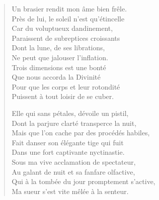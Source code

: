 \begin{verse}
  Un brasier rendit mon âme bien frêle.\\  %
  Près de lui, le soleil n’est qu’étincelle\\  %
  Car du voluptueux dandinement,\\  %
  Paraissent de subreptices croissants\\  %
  Dont la lune, de ses librations,\\  %
  Ne peut que jalouser l’inflation.\\  %
  Trois dimensions est une bonté\\  %
  Que nous accorda la Divinité\\  %
  Pour que les corps et leur rotondité\\  %
  Puissent à tout loisir de se cuber. 

  Elle qui sans pétales, dévoile un pistil,\\  %
  Dont la parjure clarté transperce la nuit,\\  %
  Mais que l’on cache par des procédés habiles,\\  %
  Fait danser son élégante tige qui fuit\\  %
  Dans une fort captivante nyctinastie.\\  %
  Sous ma vive acclamation de spectateur,\\  %
  Au galant de nuit et sa fanfare olfactive,\\  %
  Qui à la tombée du jour promptement s’active,\\  %
  Ma sueur s’est vite mêlée à la senteur.


\end{verse}
